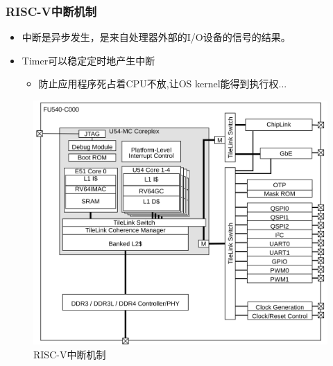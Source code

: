\documentclass[UTF8]{ctexbeamer}
\begin{document}
\begin{frame}
	\frametitle{RISC-V中断机制}
	\begin{itemize}
		\item 中断是异步发生，是来自处理器外部的I/O设备的信号的结果。
		
		
		\item Timer可以稳定定时地产生中断
		\begin{itemize}
			\item 防止应用程序死占着CPU不放,让OS kernel能得到执行权...
		\end{itemize}				
		
	\end{itemize}

	\begin{figure}
	\centering
	\includegraphics[width=0.65\linewidth]{fu540-top-block}
	\caption{RISC-V中断机制}
\end{figure}

\end{frame}

\end{document}
